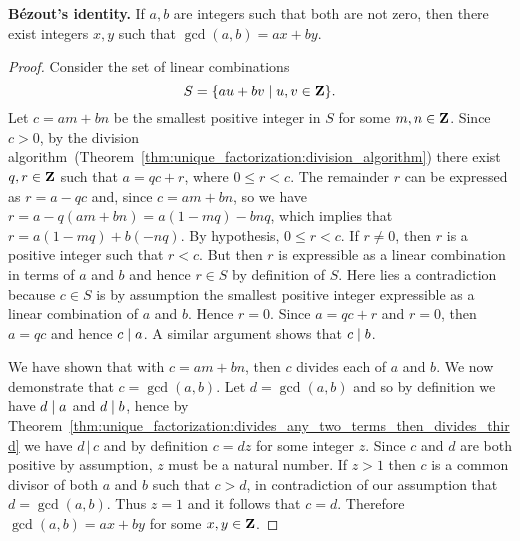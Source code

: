 \begin{theorem}
\label{thm:unique_factorization:Bezout's_identity}
\textbf{B\'ezout's identity.}
If $a,b$ are integers such that both are not zero, then there exist
integers $x,y$ such that $\gcd(a,b) = ax + by$.
\end{theorem}

\begin{proof}
Consider the set of linear combinations
\[
S
=
\{au + bv \;|\; u,v \in \mathbf{Z}\}.
\]
Let $c = am + bn$ be the smallest positive integer in $S$ for
some $m,n \in \mathbf{Z}$. Since $c > 0$, by the division
algorithm~(Theorem~\ref{thm:unique_factorization:division_algorithm})
there exist $q,r \in \mathbf{Z}$ such that $a = qc + r$, where
$0 \leq r < c$. The remainder $r$ can be expressed as $r = a - qc$
and, since $c = am + bn$, so we have $r = a - q(am+bn) = a(1-mq) - bnq$,
which implies that $r = a(1-mq) + b(-nq)$. By hypothesis, $0 \leq r < c$.
If $r \neq 0$, then $r$ is a positive integer such that $r < c$. But
then $r$ is expressible as a linear combination in terms of $a$ and
$b$ and hence $r \in S$ by definition of $S$. Here lies a
contradiction because $c \in S$ is by assumption the smallest positive
integer expressible as a linear combination of $a$ and $b$. Hence
$r = 0$. Since $a = qc + r$ and $r = 0$, then $a = qc$ and hence
$c \;|\; a$. A similar argument shows that $c \;|\; b$.

We have shown that with $c = am + bn$, then $c$ divides each of $a$
and $b$. We now demonstrate that $c = \gcd(a,b)$. Let $d = \gcd(a,b)$
and so by definition we have $d \;|\; a$ and $d \;|\; b$, hence
by
Theorem~\ref{thm:unique_factorization:divides_any_two_terms_then_divides_third}
we have $d \,|\, c$ and by definition $c = dz$ for some integer
$z$. Since $c$ and $d$ are both positive by
assumption, $z$ must be a natural number. If $z > 1$ then $c$ is a
common divisor of both $a$ and $b$ such that $c > d$, in
contradiction of our assumption that $d = \gcd(a,b)$. Thus $z = 1$
and it follows that $c = d$. Therefore $\gcd(a,b) = ax + by$ for
some $x,y \in \mathbf{Z}$.
\end{proof}


